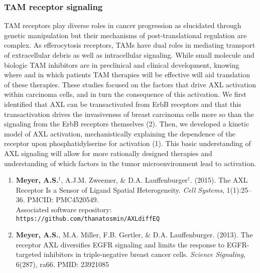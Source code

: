 \documentclass[12pt]{article}
\begin{document}

\subsubsection{TAM receptor signaling} %

TAM receptors play diverse roles in cancer progression as elucidated through genetic manipulation but their mechanisms of post-translational regulation are complex. As efferocytosis receptors, TAMs have dual roles in mediating transport of extracellular debris as well as intracellular signaling. While small molecule and biologic TAM inhibitors are in preclinical and clinical development, knowing where and in which patients TAM therapies will be effective will aid translation of these therapies. These studies focused on the factors that drive AXL activation within carcinoma cells, and in turn the consequence of this activation. We first identified that AXL can be transactivated from ErbB receptors and that this transactivation drives the invasiveness of breast carcinoma cells more so than the signaling from the ErbB receptors themselves (2). Then, we developed a kinetic model of AXL activation, mechanistically explaining the dependence of the receptor upon phosphatidylserine for activation (1). This basic understanding of AXL signaling will allow for more rationally designed therapies and understanding of which factors in the tumor microenvironment lead to activation.

\begin{enumerate}
  \item \textbf{Meyer, A.S.}$^\dag$, A.J.M. Zweemer, \& D.A. Lauffenburger$^\dag$. (2015). The AXL Receptor Is a Sensor of Ligand Spatial Heterogeneity. \emph{Cell Systems}, 1(1):25--36. PMCID: PMC4520549.\\ Associated software repository: \texttt{https://github.com/thanatosmin/AXLdiffEQ}
  \item \textbf{Meyer, A.S.}, M.A. Miller, F.B. Gertler, \& D.A. Lauffenburger. (2013). The receptor AXL diversifies EGFR signaling and limits the response to EGFR-targeted inhibitors in triple-negative breast cancer cells. \emph{Science Signaling}, 6(287), ra66. PMID: 23921085
\end{enumerate}
\end{document}
